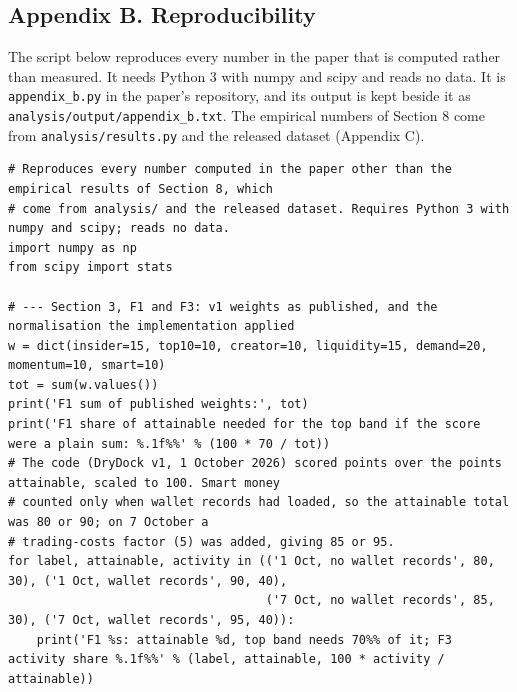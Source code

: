 \subsection{Appendix B. Reproducibility}\label{appendix-b.-reproducibility}

The script below reproduces every number in the paper that is computed rather than measured. It needs Python 3 with numpy and scipy and reads no data. It is \texttt{appendix\_b.py} in the paper's repository, and its output is kept beside it as \texttt{analysis/output/appendix\_b.txt}. The empirical numbers of Section 8 come from \texttt{analysis/results.py} and the released dataset (Appendix C).

\begin{verbatim}
# Reproduces every number computed in the paper other than the empirical results of Section 8, which
# come from analysis/ and the released dataset. Requires Python 3 with numpy and scipy; reads no data.
import numpy as np
from scipy import stats

# --- Section 3, F1 and F3: v1 weights as published, and the normalisation the implementation applied
w = dict(insider=15, top10=10, creator=10, liquidity=15, demand=20, momentum=10, smart=10)
tot = sum(w.values())
print('F1 sum of published weights:', tot)
print('F1 share of attainable needed for the top band if the score were a plain sum: %.1f%%' % (100 * 70 / tot))
# The code (DryDock v1, 1 October 2026) scored points over the points attainable, scaled to 100. Smart money
# counted only when wallet records had loaded, so the attainable total was 80 or 90; on 7 October a
# trading-costs factor (5) was added, giving 85 or 95.
for label, attainable, activity in (('1 Oct, no wallet records', 80, 30), ('1 Oct, wallet records', 90, 40),
                                    ('7 Oct, no wallet records', 85, 30), ('7 Oct, wallet records', 95, 40)):
    print('F1 %s: attainable %d, top band needs 70%% of it; F3 activity share %.1f%%' % (label, attainable, 100 * activity / attainable))


\end{verbatim}
